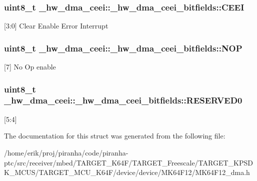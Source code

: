 \subsubsection[{\texorpdfstring{C\+E\+EI}{CEEI}}]{\setlength{\rightskip}{0pt plus 5cm}uint8\+\_\+t \+\_\+hw\+\_\+dma\+\_\+ceei\+::\+\_\+hw\+\_\+dma\+\_\+ceei\+\_\+bitfields\+::\+C\+E\+EI}\hypertarget{struct__hw__dma__ceei_1_1__hw__dma__ceei__bitfields_a3fc9d25338f681c97a814159f1aa4c5e}{}\label{struct__hw__dma__ceei_1_1__hw__dma__ceei__bitfields_a3fc9d25338f681c97a814159f1aa4c5e}
\mbox{[}3\+:0\mbox{]} Clear Enable Error Interrupt 
\subsubsection[{\texorpdfstring{N\+OP}{NOP}}]{\setlength{\rightskip}{0pt plus 5cm}uint8\+\_\+t \+\_\+hw\+\_\+dma\+\_\+ceei\+::\+\_\+hw\+\_\+dma\+\_\+ceei\+\_\+bitfields\+::\+N\+OP}\hypertarget{struct__hw__dma__ceei_1_1__hw__dma__ceei__bitfields_ae88b295dc0eae083556e18a17ec9d9ae}{}\label{struct__hw__dma__ceei_1_1__hw__dma__ceei__bitfields_ae88b295dc0eae083556e18a17ec9d9ae}
\mbox{[}7\mbox{]} No Op enable 
\subsubsection[{\texorpdfstring{R\+E\+S\+E\+R\+V\+E\+D0}{RESERVED0}}]{\setlength{\rightskip}{0pt plus 5cm}uint8\+\_\+t \+\_\+hw\+\_\+dma\+\_\+ceei\+::\+\_\+hw\+\_\+dma\+\_\+ceei\+\_\+bitfields\+::\+R\+E\+S\+E\+R\+V\+E\+D0}\hypertarget{struct__hw__dma__ceei_1_1__hw__dma__ceei__bitfields_af382b0c1309333e7a7ffc8d566c49640}{}\label{struct__hw__dma__ceei_1_1__hw__dma__ceei__bitfields_af382b0c1309333e7a7ffc8d566c49640}
\mbox{[}5\+:4\mbox{]} 

The documentation for this struct was generated from the following file\+:\begin{DoxyCompactItemize}
\item 
/home/erik/proj/piranha/code/piranha-\/ptc/src/receiver/mbed/\+T\+A\+R\+G\+E\+T\+\_\+\+K64\+F/\+T\+A\+R\+G\+E\+T\+\_\+\+Freescale/\+T\+A\+R\+G\+E\+T\+\_\+\+K\+P\+S\+D\+K\+\_\+\+M\+C\+U\+S/\+T\+A\+R\+G\+E\+T\+\_\+\+M\+C\+U\+\_\+\+K64\+F/device/device/\+M\+K64\+F12/M\+K64\+F12\+\_\+dma.\+h\end{DoxyCompactItemize}
